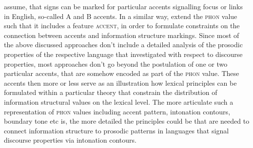 \documentclass[output=paper]{langsci/langscibook}
\begin{document}
\cite{EV96a} assume, that signs can be marked for particular accents
signalling focus or links in English, so-called A and B accents.  In a
similar way, \cite{deKuthy2002a} extend the \textsc{phon} value such
that it includes a feature \textsc{accent}, in order to formulate
constraints on the connection between accents and information
structure markings.  Since most of the above discussed approaches
don't include a detailed analysis of the prosodic properties of the
respective language that investigated with respect to discourse
properties, most approaches don't go beyond the postulation of one or
two particular accents, that are somehow encoded as part of the
\textsc{phon} value. These accents then more or less serve as an
illustration how lexical principles can be formulated within a
particular theory that constrain the distribution of information
structural values on the lexical level. The more articulate such a
representation of \textsc{phon} values including accent pattern,
intonation contours, boundary tone etc is, the more detailed the principles
could be that are needed to connect information structure to
prosodic patterns in languages that signal discourse properties via
intonation contours.
\end{document}
